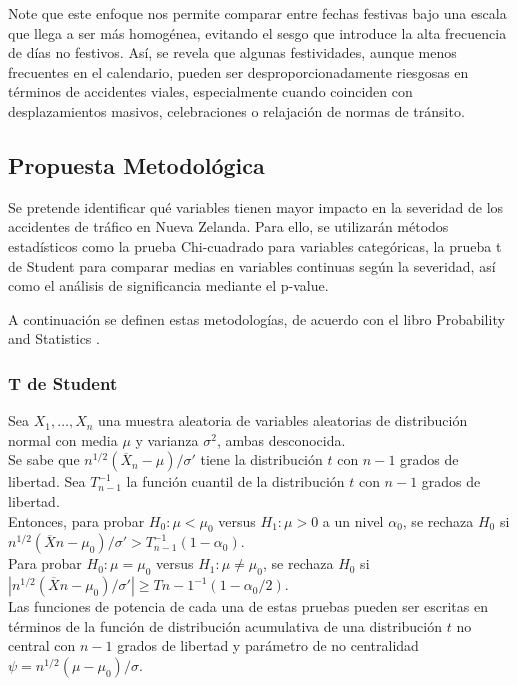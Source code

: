 \documentclass{book}
\begin{document}
Note que este enfoque nos permite comparar entre fechas festivas bajo una escala que llega a ser más homogénea, evitando el sesgo que introduce la alta frecuencia de días no festivos. Así, se revela que algunas festividades, aunque menos frecuentes en el calendario, pueden ser desproporcionadamente riesgosas en términos de accidentes viales, especialmente cuando coinciden con desplazamientos masivos, celebraciones o relajación de normas de tránsito.

\newpage

\subsection{Propuesta Metodológica}
Se pretende identificar qué variables tienen mayor impacto en la severidad de los accidentes de tráfico en Nueva Zelanda. Para ello, se utilizarán métodos estadísticos como la prueba Chi-cuadrado para variables categóricas, la prueba t de Student para comparar medias en variables continuas según la severidad, así como el análisis de significancia mediante el p-value. 

A continuación se definen estas metodologías, de acuerdo con el libro Probability and Statistics \cite{degroot2012probability}.

\subsubsection{T de Student}
Sea $X_1, \ldots, X_n$ una muestra aleatoria de variables aleatorias de distribución normal con media $\mu$ y varianza $\sigma^2$, ambas desconocida. \\
Se sabe que $n^{1/2}(\overline{X}_n - \mu)/\sigma'$ tiene la distribución $t$ con $n - 1$ grados de libertad. Sea $T_{n-1}^{-1}$ la función cuantil de la distribución $t$ con $n - 1$ grados de libertad.\\
Entonces, para probar $H_0: \mu < \mu_0$ versus $H_1: \mu > 0$ a un nivel $\alpha_0$, se rechaza $H_0$ si $n^{1/2}(\overline{X}n - \mu_0)/\sigma' > T_{n-1}^{-1}(1 - \alpha_0)$. \\
Para probar $H_0: \mu = \mu_0$ versus $H_1: \mu \neq \mu_0$, se rechaza $H_0$ si $|n^{1/2}(\overline{X}n - \mu_0)/\sigma'| \geq T{n-1}^{-1}(1 - \alpha_0/2)$. \\
Las funciones de potencia de cada una de estas pruebas pueden ser escritas en términos de la función de distribución acumulativa de una distribución $t$ no central con $n - 1$ grados de libertad y parámetro de no centralidad $\psi = n^{1/2}(\mu - \mu_0)/\sigma$.
\end{document}
